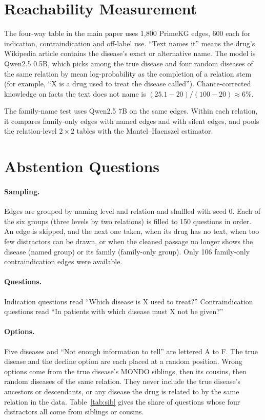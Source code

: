 \documentclass[letterpaper]{article} %
\begin{document}
\section{Reachability Measurement}

The four-way table in the main paper uses 1,800 PrimeKG edges, 600 each for
indication, contraindication and off-label use. ``Text names it'' means the
drug's Wikipedia article contains the disease's exact or alternative name. The
model is Qwen2.5 0.5B, which picks among the true disease and four random
diseases of the same relation by mean log-probability as the completion of a
relation stem (for example, ``X is a drug used to treat the disease called'').
Chance-corrected knowledge on facts the text does not name is
$(25.1 - 20)/(100 - 20) \approx 6\%$.

The family-name test uses Qwen2.5 7B on the same edges. Within each relation,
it compares family-only edges with named edges and with silent edges, and pools
the relation-level $2 \times 2$ tables with the Mantel--Haenszel estimator.

\section{Abstention Questions}

\paragraph{Sampling.}
Edges are grouped by naming level and relation and shuffled with seed 0. Each
of the six groups (three levels by two relations) is filled to 150 questions
in order. An edge is skipped, and the next one taken, when its drug has no
text, when too few distractors can be drawn, or when the cleaned passage no
longer shows the disease (named group) or its family (family-only group).
Only 106 family-only contraindication edges were available.

\paragraph{Questions.}
Indication questions read ``Which disease is X used to treat?''
Contraindication questions read ``In patients with which disease must X not be
given?''

\paragraph{Options.}
Five diseases and ``Not enough information to tell'' are lettered A to F. The
true disease and the decline option are each placed at a random position.
Wrong options come from the true disease's MONDO siblings, then its cousins,
then random diseases of the same relation. They never include the true
disease's ancestors or descendants, or any disease the drug is related to by
the same relation in the data. Table~\ref{tab:sib} gives the share of
questions whose four distractors all come from siblings or cousins.
\end{document}
